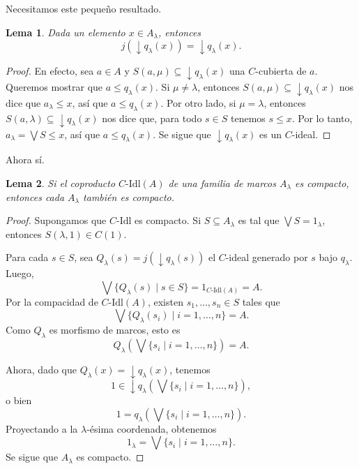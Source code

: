 \documentclass[12pt,letterpaper,titlepage]{article}
\newtheorem{lemma}{Lema}
\theoremstyle{definition}
\newcommand\Sup{\bigvee}
\newcommand\down{{\downarrow}}
\newcommand\<{\langle}
\renewcommand\>{\rangle}
\newcommand\Idl{\text{-}\mathrm{Idl}}
\begin{document}
Necesitamos este pequeño resultado.
\begin{lemma}
Dada un elemento $x\in A_\lambda$, entonces
\[
    j(\down q_\lambda(x)) = \down q_\lambda(x)
.\]
\end{lemma}
\begin{proof}
    En efecto, sea $a\in A$ y $S(a,\mu)\subseteq\down q_\lambda(x)$
    una $C$-cubierta de $a$.
    Queremos mostrar que $a\leq q_\lambda(x)$.
    Si $\mu\neq\lambda$, entonces $S(a,\mu)\subseteq \down q_\lambda(x)$
    nos dice que $a_\lambda\leq x$, así que $a\leq q_\lambda(x)$.
    Por otro lado, si $\mu=\lambda$, entonces
    $S(a,\lambda) \subseteq \down q_\lambda(x)$ nos dice que, para todo
    $s\in S$ tenemos $s\leq x$.
    Por lo tanto, $a_\lambda=\Sup S\leq x$, así que $a\leq q_\lambda(x)$.
    Se sigue que $\down q_\lambda(x)$ es un $C$-ideal.
\end{proof}
Ahora sí.

\begin{lemma}
    Si el coproducto $C\Idl(A)$ de una familia de marcos
    $A_\lambda$ es compacto, entonces cada $A_\lambda$
    también es compacto.
\end{lemma}
\begin{proof}
    Supongamos que $C\Idl$ es compacto.
    Si $S\subseteq A_\lambda$ es tal que $\Sup S=1_\lambda$,
    entonces $S(\lambda,1)\in C(1)$.
    
    Para cada $s\in S$, sea $Q_\lambda(s)
    = j(\down q_\lambda(s))$
    el $C$-ideal generado por $s$ bajo $q_\lambda$.
    Luego,
    \[
        \Sup\{Q_\lambda(s) \mid s\in S\} = 1_{C\Idl(A)} = A
    .\]
    Por la compacidad de $C\Idl(A)$,
    existen $s_1,\dots,s_n\in S$ tales que
    \[
        \Sup\{Q_\lambda(s_i) \mid i=1,\dots,n\} = A
    .\]
    Como $Q_\lambda$ es morfismo de marcos, esto es
    \[
        Q_\lambda(\Sup\{s_i \mid i=1,\dots,n\}) = A
    .\]
    
    Ahora, dado que $Q_\lambda(x) = \down q_\lambda(x)$, tenemos
    \[
        1 \in \down q_\lambda(\Sup\{s_i \mid i=1,\dots,n\})
    ,\]
    o bien
    \[
        1 = q_\lambda(\Sup\{s_i \mid i=1,\dots,n\})
    .\]
    Proyectando a la $\lambda$-ésima coordenada, obtenemos
    \[
        1_\lambda = \Sup\{s_i \mid i=1,\dots,n\}
    .\]
    Se sigue que $A_\lambda$ es compacto.
\end{proof}
\end{document}
